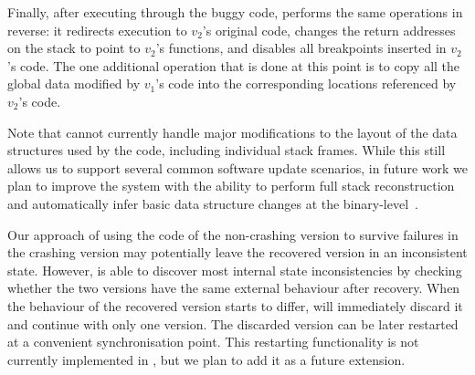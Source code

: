 Finally, after executing through the buggy code, \rem performs the
same operations in reverse: it redirects execution to $v_2$'s original
code, changes the return addresses on the stack to point to $v_2$'s
functions, and disables all breakpoints inserted in $v_2$'s code.  
The one additional operation that is done at this point is to copy all
the global data modified by $v_1$'s code into the corresponding
locations referenced by $v_2$'s code.  




Note that \mx cannot currently handle major modifications to the
layout of the data structures used by the code, including individual
stack frames.  While this still allows us to support several common
software update scenarios, in future work we plan to improve the
system with the ability to perform full stack
reconstruction~\cite{upstare} and automatically infer basic data
structure changes at the binary-level~\cite{data-struct-digging}.


Our approach of using the code of the non-crashing version to survive failures
in the crashing version may potentially leave the recovered version in an
inconsistent state. However, \mx is able to discover most internal state
inconsistencies by checking whether the two versions have the same external
behaviour after recovery. When the behaviour of the recovered version starts to
differ, \mx will immediately discard it and continue with only one version. The
discarded version can be later restarted at a convenient synchronisation point.
This restarting functionality is not currently implemented in \mx, but we plan
to add it as a future extension.

